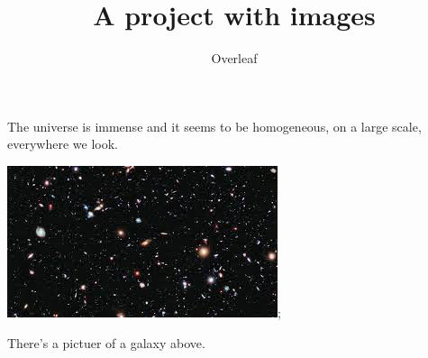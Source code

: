 \documentclass{article}
\title{A project with images}
\author{Overleaf}
\begin{document}
\maketitle

The universe is immense and it seems to be homogeneous, on a large scale, everywhere we look.

\includegraphics{Universe};

There's a pictuer of a galaxy above.
\end{document}
